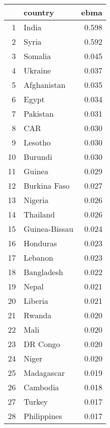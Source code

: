 \begin{table}[ht]
\centering
\begin{tabular}{rlr}
  \hline
 & country & ebma \\ 
  \hline
1 & India & 0.598 \\ 
  2 & Syria & 0.592 \\ 
  3 & Somalia & 0.045 \\ 
  4 & Ukraine & 0.037 \\ 
  5 & Afghanistan & 0.035 \\ 
  6 & Egypt & 0.034 \\ 
  7 & Pakistan & 0.031 \\ 
  8 & CAR & 0.030 \\ 
  9 & Lesotho & 0.030 \\ 
  10 & Burundi & 0.030 \\ 
  11 & Guinea & 0.029 \\ 
  12 & Burkina Faso & 0.027 \\ 
  13 & Nigeria & 0.026 \\ 
  14 & Thailand & 0.026 \\ 
  15 & Guinea-Bissau & 0.024 \\ 
  16 & Honduras & 0.023 \\ 
  17 & Lebanon & 0.023 \\ 
  18 & Bangladesh & 0.022 \\ 
  19 & Nepal & 0.021 \\ 
  20 & Liberia & 0.021 \\ 
  21 & Rwanda & 0.020 \\ 
  22 & Mali & 0.020 \\ 
  23 & DR Congo & 0.020 \\ 
  24 & Niger & 0.020 \\ 
  25 & Madagascar & 0.019 \\ 
  26 & Cambodia & 0.018 \\ 
  27 & Turkey & 0.017 \\ 
  28 & Philippines & 0.017 \\ 
   \hline
\end{tabular}
\label{top-fcast}
\end{table}
